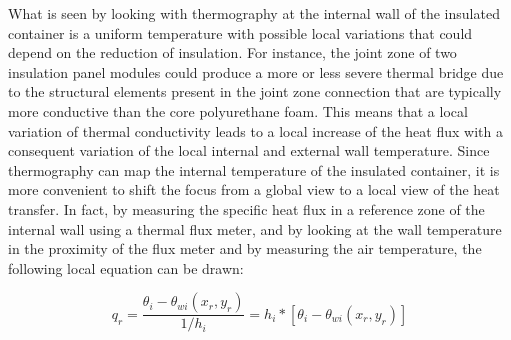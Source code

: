 What is seen by looking with thermography at the internal wall of the insulated container is a uniform temperature with possible local variations that could depend on the reduction of insulation. For instance, the joint zone of two insulation panel modules could produce a more or less severe thermal bridge due to the structural elements present in the joint zone connection that are typically more conductive than the core polyurethane foam. This means that a local variation of thermal conductivity leads to a local increase of the heat flux with a consequent variation of the local internal and external wall temperature. Since thermography can map the internal temperature of the insulated container, it is more convenient to shift the focus from a global view to a local view of the heat transfer. In fact, by measuring the specific heat flux in a reference zone of the internal wall using a thermal flux meter, and by looking at the wall temperature in the proximity of the flux meter and by measuring the air temperature, the following local equation can be drawn:

\begin{equation}
q_r=\frac{\theta_i-\theta_{wi}(x_r,y_r )}{1/h_i} = h_i*[\theta_i-\theta_{wi}(x_r,y_r )]
\end{equation}


